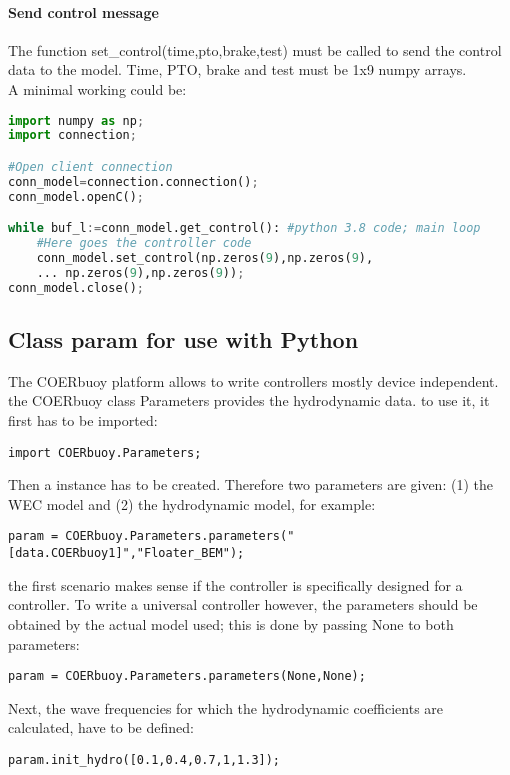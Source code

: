 \documentclass[oneside,10pt,a4paper]{book}
\begin{document}
\paragraph{Send control message}
The function set\_control(time,pto,brake,test) must be called to send the control data to the model. Time, PTO, brake and test must be 1x9 numpy arrays.\\
A minimal working could be:
\begin{lstlisting}[language=Python]
import numpy as np;
import connection;

#Open client connection
conn_model=connection.connection();
conn_model.openC();

while buf_l:=conn_model.get_control(): #python 3.8 code; main loop
    #Here goes the controller code
    conn_model.set_control(np.zeros(9),np.zeros(9),
    ... np.zeros(9),np.zeros(9));
conn_model.close();
\end{lstlisting}
\subsection{Class param for use with Python}
The COERbuoy platform allows to write controllers mostly device independent. the COERbuoy class Parameters provides the hydrodynamic data. to use it, it first has to be imported:
\begin{verbatim}
import COERbuoy.Parameters;
\end{verbatim}
Then a instance has to be created. Therefore two parameters are given: (1) the WEC model and (2) the hydrodynamic model, for example:
\begin{verbatim}
param = COERbuoy.Parameters.parameters("[data.COERbuoy1]","Floater_BEM");
\end{verbatim}
the first scenario makes sense if the controller is specifically designed for a controller. To write a universal controller however, the parameters should be obtained by the actual model used; this is done by passing None to both parameters:
\begin{verbatim}
param = COERbuoy.Parameters.parameters(None,None);
\end{verbatim}
Next, the wave frequencies for which the hydrodynamic coefficients are calculated, have to be defined:
\begin{verbatim}
param.init_hydro([0.1,0.4,0.7,1,1.3]);
\end{verbatim}
\end{document}
